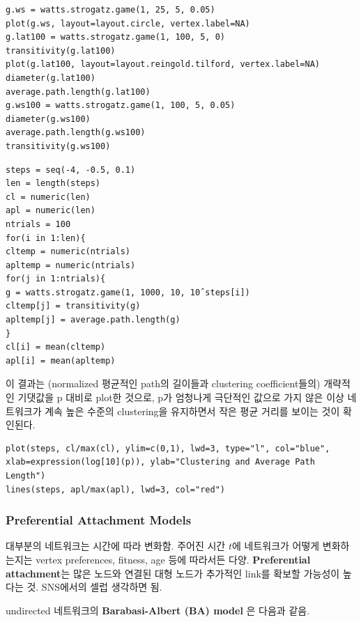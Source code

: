 \documentclass[
]{book}
\begin{document}
{{{\begin{verbatim}
g.ws = watts.strogatz.game(1, 25, 5, 0.05)
plot(g.ws, layout=layout.circle, vertex.label=NA)
g.lat100 = watts.strogatz.game(1, 100, 5, 0)
transitivity(g.lat100)
plot(g.lat100, layout=layout.reingold.tilford, vertex.label=NA)
diameter(g.lat100)
average.path.length(g.lat100)
g.ws100 = watts.strogatz.game(1, 100, 5, 0.05)
diameter(g.ws100)
average.path.length(g.ws100)
transitivity(g.ws100)
\end{verbatim}

\begin{verbatim}
steps = seq(-4, -0.5, 0.1)
len = length(steps)
cl = numeric(len)
apl = numeric(len)
ntrials = 100
for(i in 1:len){
cltemp = numeric(ntrials)
apltemp = numeric(ntrials)
for(j in 1:ntrials){
g = watts.strogatz.game(1, 1000, 10, 10ˆsteps[i])
cltemp[j] = transitivity(g)
apltemp[j] = average.path.length(g)
}
cl[i] = mean(cltemp)
apl[i] = mean(apltemp)
\end{verbatim}

이 결과는 (normalized 평균적인 path의 길이들과 clustering coefficient들의) 개략적인 기댓값을 p 대비로 plot한 것으로, p가 엄청나게 극단적인 값으로 가지 않은 이상 네트워크가 계속 높은 수준의 clustering을 유지하면서 작은 평균 거리를 보이는 것이 확인된다.

\begin{verbatim}
plot(steps, cl/max(cl), ylim=c(0,1), lwd=3, type="l", col="blue",
xlab=expression(log[10](p)), ylab="Clustering and Average Path Length")
lines(steps, apl/max(apl), lwd=3, col="red")
\end{verbatim}

\hypertarget{preferential-attachment-models}{%
\subsubsection{Preferential Attachment Models}\label{preferential-attachment-models}}

대부분의 네트워크는 시간에 따라 변화함. 주어진 시간 \(t\)에 네트워크가 어떻게 변화하는지는 vertex preferences, fitness, age 등에 따라서든 다양. \textbf{Preferential attachment}는 많은 노드와 연결된 대형 노드가 추가적인 link를 확보할 가능성이 높다는 것. SNS에서의 셀럽 생각하면 됨.

undirected 네트워크의 \textbf{Barabasi-Albert (BA) model} 은 다음과 같음.

}}}
\end{document}
